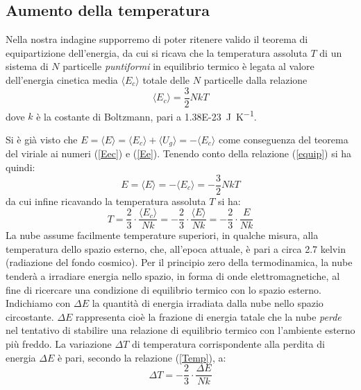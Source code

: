 \subsection{Aumento della temperatura}\label{aumentot}
Nella nostra indagine supporremo di poter ritenere valido il teorema di equipartizione dell'energia,
da cui si ricava che la temperatura assoluta $T$ di un sistema di $N$ particelle
\emph{puntiformi} in equilibrio termico \`e legata al valore dell'energia cinetica media $\langle E_{c} \rangle$ totale delle $N$ particelle dalla relazione
\begin{equation}\label{equip}
\langle E_{c} \rangle = \frac{3}{2} NkT
\end{equation}
dove $k$ \`e la costante di Boltzmann, pari a \SI{1.38E-23}{\joule\per\kelvin}.
\par
Si \`{e} gi\`{a} visto che $E=\langle E \rangle = \langle E_{c} \rangle + \langle U_{g} \rangle = - \langle E_{c} \rangle$ come conseguenza del teorema del viriale ai numeri (\ref{Eec}) e (\ref{Ee}). Tenendo conto della relazione (\ref{equip}) si ha quindi:
\begin{equation}\label{Eequip}
E = \langle E \rangle = - \langle E_{c} \rangle  = - \frac{3}{2}  NkT
\end{equation}
da cui infine ricavando la temperatura assoluta $T$ si ha:
\begin{equation}\label{Temp}
T = \frac{2}{3} \cdot \frac{\langle E_{c} \rangle }{Nk} = -\frac{2}{3} \cdot \frac{ \langle E \rangle }{Nk} = -\frac{2}{3} \cdot \frac{E}{Nk}
\end{equation}
La nube assume facilmente temperature superiori, in qualche misura, alla temperatura dello spazio esterno, che, all'epoca attuale, \`{e} pari a circa 2.7 kelvin (radiazione del fondo cosmico). Per il principio zero della termodinamica, la nube tender\`{a} a irradiare energia nello spazio, in forma di onde elettromagnetiche, al fine di ricercare una condizione di equilibrio termico con lo spazio esterno.
Indichiamo con $\Delta E$ la quantit\`{a} di energia irradiata dalla nube nello spazio circostante. $\Delta E$ rappresenta cio\`{e} la frazione di energia tatale che la nube \emph{perde} nel tentativo di stabilire una relazione di equilibrio termico con l'ambiente esterno pi\`{u} freddo. La variazione $\Delta T$ di temperatura corrispondente alla perdita di energia $\Delta E$  \`{e} pari, secondo la relazione (\ref{Temp}), a:
\begin{equation}\label{DeltaT}
\Delta T = -\frac{2}{3} \cdot \frac{\Delta E}{Nk}
\end{equation}
